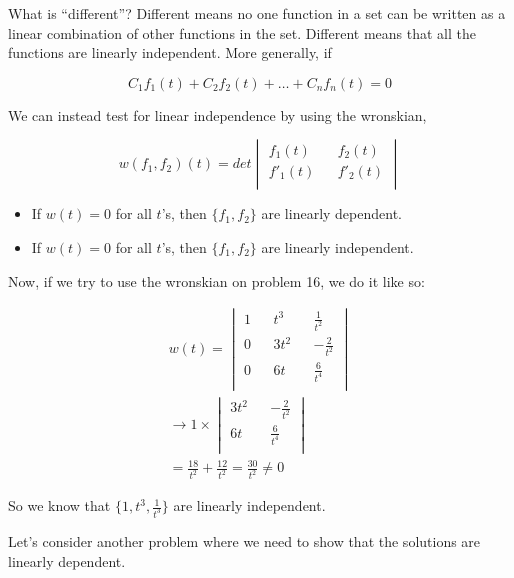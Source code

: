   What is “different”? Different means no one function in a set can be written as a linear combination of other functions in the set. Different means that all the functions are linearly independent. More generally, if 

  \[
    C_1f_1(t)+C_2f_2(t)+\dots+C_nf_n(t)=0
  \]

  \begin{theorem}
    We can instead test for linear independence by using the wronskian,

    \[
      w(f_1,f_2)(t)=det\begin{vmatrix}
        f_1(t)&&f_2(t)\\f'_1(t)&&f'_2(t)\\
      \end{vmatrix}
    \]

    \begin{itemize}
      \item If $w(t)=0$ for all $t$'s, then $\{f_1,f_2\}$ are linearly dependent.
      \item If $w(t)=0$ for all $t$'s, then $\{f_1,f_2\}$ are linearly independent.
    \end{itemize}
  \end{theorem}

  Now, if we try to use the wronskian on problem 16, we do it like so:

  \begin{align*}
    w(t)=
    \begin{vmatrix}
      1&&t^3&&\frac{1}{t^2}\\
      0&&3t^2&&-\frac{2}{t^2}\\
      0&&6t&&\frac{6}{t^4}\\
    \end{vmatrix}\\
    \to 1\times
    \begin{vmatrix}
      3t^2&&-\frac{2}{t^2}\\
      6t&&\frac{6}{t^4}\\
    \end{vmatrix}\\
    =\frac{18}{t^2}+\frac{12}{t^2}=\frac{30}{t^2}\neq0
  \end{align*}

  So we know that $\{1,t^3,\frac{1}{t^3}\}$ are linearly independent. 

  Let's consider another problem where we need to show that the solutions are linearly dependent.

